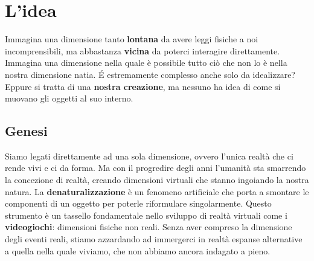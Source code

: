 \newcommand{\mylanguages}{italian} %
\newcommand{\mytitle}{Black Cube}
\newcommand{\mysubtitle}{Denaturalizzazione estremizzata, ambiente virtuale espanso, alienazione dalla dimensione umana}
\newcommand{\authorone}{Giancarlo Bottalico}
\newcommand{\institutione}{Conservatorio di musica "N. Piccinni", Bari}
\newcommand{\emailone}{giancarlobottalico@gmail.com}


	\maketitle
	\thispagestyle{empty}
	
\section{L'idea}
Immagina una dimensione tanto \textbf{lontana} da avere leggi fisiche a noi incomprensibili, ma abbastanza \textbf{vicina} da poterci interagire direttamente. Immagina una dimensione nella quale è possibile tutto ciò che non lo è nella nostra dimensione natia. É estremamente complesso anche solo da idealizzare? Eppure si tratta di una \textbf{nostra creazione}, ma nessuno ha idea di come si muovano gli oggetti al suo interno.
	
	\subsection{Genesi}
	Siamo legati direttamente ad una sola dimensione, ovvero l'unica realtà che ci rende vivi e ci da forma. Ma con il progredire degli anni l'umanità sta smarrendo la concezione di realtà, creando dimensioni virtuali che stanno ingoiando la nostra natura.
	La \textbf{denaturalizzazione} è un fenomeno artificiale che porta a smontare le componenti di un oggetto per poterle riformulare singolarmente. Questo strumento è un tassello fondamentale nello sviluppo di realtà virtuali come i \textbf{videogiochi}: dimensioni fisiche non reali.
	Senza aver compreso la dimensione degli eventi reali, stiamo azzardando ad immergerci in realtà espanse alternative a quella nella quale viviamo, che non abbiamo ancora indagato a pieno.
	
